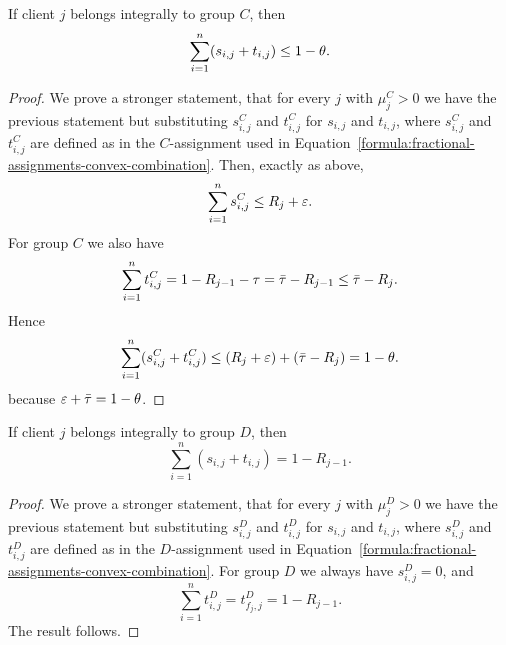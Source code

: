 \begin{lemma}
    \label{lem:tran-C}
    If client $j$ belongs integrally to group $C$, then
    \begin{equation*}
        \sum_{i=1}^n (s_{i,j} + t_{i,j}) \leq 1-\theta.
    \end{equation*}
\end{lemma}
\begin{proof}
    We prove a stronger statement, that for every $j$ with $\mu_j^C > 0$ we have the previous statement but substituting $s_{i,j}^C$ and $t_{i,j}^C$ for $s_{i,j}$ and $t_{i,j}$, where $s_{i,j}^C$ and $t_{i,j}^C$ are defined as in the $C$-assignment used in Equation~\ref{formula:fractional-assignments-convex-combination}.
    Then, exactly as above,
    \begin{equation*}
        \sum_{i=1}^n s_{i,j}^C \le R_j + \varepsilon.
    \end{equation*}
    For group $C$ we also have
    \begin{equation*}
        \sum_{i=1}^n t_{i,j}^C = 1-R_{j-1}-\tau = \bar\tau-R_{j-1} \le \bar\tau-R_j.
    \end{equation*}
    Hence
    \begin{equation*}
        \sum_{i=1}^n (s_{i,j}^C+t_{i,j}^C) \le (R_j+\varepsilon) + (\bar\tau-R_j) = 1-\theta.
    \end{equation*}
    because $\varepsilon + \bar\tau = 1-\theta$.
\end{proof}

\begin{lemma}
    \label{lem:tran-D}
    If client $j$ belongs integrally to group $D$, then
    \begin{equation*}
        \sum_{i=1}^n (s_{i,j} + t_{i,j}) = 1 - R_{j-1}.
    \end{equation*}
\end{lemma}
\begin{proof}
    We prove a stronger statement, that for every $j$ with $\mu_j^D > 0$ we have the previous statement but substituting $s_{i,j}^D$ and $t_{i,j}^D$ for $s_{i,j}$ and $t_{i,j}$, where $s_{i,j}^D$ and $t_{i,j}^D$ are defined as in the $D$-assignment used in Equation~\ref{formula:fractional-assignments-convex-combination}.
    For group $D$ we always have $s_{i,j}^D=0$, and
    \begin{equation*}
        \sum_{i=1}^n t_{i,j}^D = t_{f_j,j}^D = 1-R_{j-1}.
    \end{equation*}
    The result follows.
\end{proof}

